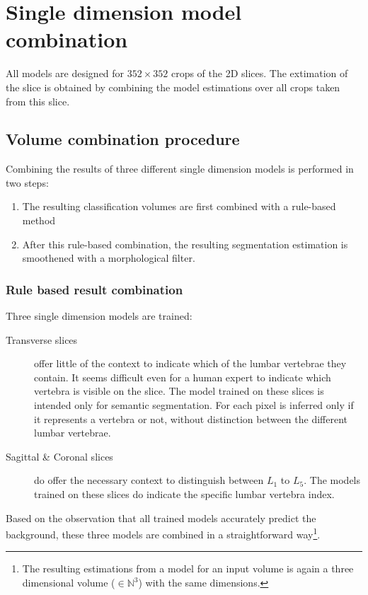 
\chapter{Single dimension model combination}

All models are designed for $352 \times 352$ crops of the 2D slices.
The extimation of the slice is obtained by combining the model estimations over all crops taken from this slice.

\section{Volume combination procedure}

Combining the results of three different single dimension models is performed in two steps:
\begin{enumerate}
    \item The resulting classification volumes are first combined with a rule-based method
    \item After this rule-based combination, the resulting segmentation estimation is smoothened with a morphological filter.
\end{enumerate}

\subsection{Rule based result combination}
Three single dimension models are trained:
\begin{description}
    \item[Transverse slices] offer little of the context to indicate which of the lumbar vertebrae they contain. 
    It seems difficult even for a human expert to indicate which vertebra is visible on the slice.
    The model trained on these slices is intended only for semantic segmentation.
    For each pixel is inferred only if it represents a vertebra or not, without distinction between the different lumbar vertebrae. 
    \item[Sagittal \& Coronal slices] do offer the necessary context to distinguish between $L_1$ to $L_5$. 
    The models trained on these slices do indicate the specific lumbar vertebra index. 
\end{description}

Based on the observation that all trained models accurately predict the background, these three models are combined in a straightforward way\footnote{
    The resulting estimations from a model for an input volume is again a three dimensional volume ($\in \mathbb{N}^3$) with the same dimensions.
}.

